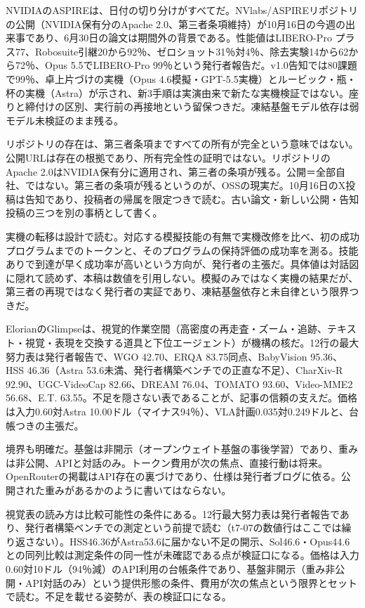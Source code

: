\documentclass[lualatex,a4paper,10pt]{jlreq}
\begin{document}
NVIDIAのASPIREは、日付の切り分けがすべてだ。NVlabs/ASPIREリポジトリの公開（NVIDIA保有分のApache 2.0、第三者条項維持）が10月16日の今週の出来事であり、6月30日の論文は期間外の背景である。性能値はLIBERO-Pro プラス77、Robosuite引継20から92％、ゼロショット31％対4％、除去実験14から62から72％、Opus 5.5でLIBERO-Pro 99％という発行者報告だ。v1.0告知では80課題で99％、卓上片づけの実機（Opus 4.6模擬・GPT-5.5実機）とルービック・瓶・杯の実機（Astra）が示され、新3手順は実演由来で新たな実機検証ではない。座りと締付けの区別、実行前の再接地という留保つきだ。凍結基盤モデル依存は弱モデル未検証のまま残る。
\cite{B57,B56,B89}


リポジトリの存在は、第三者条項まですべての所有が完全という意味ではない。公開URLは存在の根拠であり、所有完全性の証明ではない。リポジトリのApache 2.0はNVIDIA保有分に適用され、第三者の条項が残る。公開＝全部自社、ではない。第三者の条項が残るというのが、OSSの現実だ。10月16日のX投稿は告知であり、投稿者の帰属を限定つきで読む。古い論文・新しい公開・告知投稿の三つを別の事柄として書く。
\cite{B57,B56}


実機の転移は設計で読む。対応する模擬技能の有無で実機改修を比べ、初の成功プログラムまでのトークンと、そのプログラムの保持評価の成功率を測る。技能ありで到達が早く成功率が高いという方向が、発行者の主張だ。具体値は対話図に隠れて読めず、本稿は数値を引用しない。模擬のみではなく実機の結果だが、第三者の再現ではなく発行者の実証であり、凍結基盤依存と未自律という限界つきだ。
\cite{B57,B56,B89}


ElorianのGlimpseは、視覚的作業空間（高密度の再走査・ズーム・追跡、テキスト・視覚・表現を交換する道具と下位エージェント）が機構の核だ。12行の最大努力表は発行者報告で、WGO 42.70、ERQA 83.75同点、BabyVision 95.36、HSS 46.36（Astra 53.6未満、発行者構築ベンチでの正直な不足）、CharXiv-R 92.90、UGC-VideoCap 82.66、DREAM 76.04、TOMATO 93.60、Video-MME2 56.68、E.T. 63.55。不足を隠さない表であることが、記事の信頼の支えだ。価格は入力0.60対Astra 10.00ドル（マイナス94％）、VLA計画0.035対0.249ドルと、台帳つきの主張だ。
\cite{B58,B59,B88}


境界も明確だ。基盤は非開示（オープンウェイト基盤の事後学習）であり、重みは非公開、APIと対話のみ。トークン費用が次の焦点、直接行動は将来。OpenRouterの掲載はAPI存在の裏づけであり、仕様は発行者ブログに依る。公開された重みがあるかのように書いてはならない。
\cite{B58,B59,B88}


視覚表の読み方は比較可能性の条件にある。12行最大努力表は発行者報告であり、発行者構築ベンチでの測定という前提で読む（t7-07の数値行はここでは繰り返さない）。HSS46.36がAstra53.6に届かない不足の開示、Sol46.6・Opus44.6との同列比較は測定条件の同一性が未確認である点が検証口になる。価格は入力0.60対10ドル（94％減）のAPI利用の台帳条件であり、基盤非開示（重み非公開・API対話のみ）という提供形態の条件、費用が次の焦点という限界とセットで読む。不足を載せる姿勢が、表の検証口になる。
\cite{B58,B59,B88}
\end{document}
